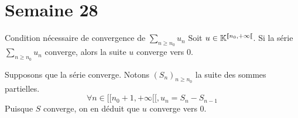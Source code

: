 \documentclass{article}
\renewenvironment{question_kholle}[2][ ]
{
	\subsection{\texorpdfstring{#2}{}}
	\notblank{#1}
	{
		\noindent #1
		\bigbreak
	}
	{}
	\begin{proof}
}
{
	\end{proof}
}
\begin{document}
\pagebreak\section{Semaine 28}

\begin{question_kholle}{Condition nécessaire de convergence de $\sum_{n \geqslant n_0} u_n$}
	Soit $u \in \mathbb K^{[ \! [ n_{0}, + \infty [ \![}$.
	Si la série $\sum_{n\geqslant n_{0}}u_{n}$ converge, alors la suite $u$ converge vers $0$.

	Supposons que la série converge. Notons $(S_{n})_{n\geqslant n_{0}}$ la suite des sommes partielles.
	$$\forall n \in [ \! [ n_{0}+1, +\infty [ \![, u_{n} = S_{n} - S_{n-1}$$
	Puisque $S$ converge, on en déduit que $u$ converge vers $0$.
\end{question_kholle}
\end{document}

